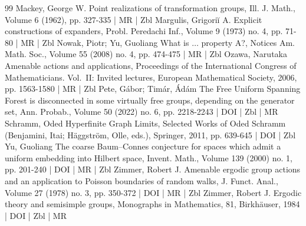 \documentclass[10pt]{amsart}
\theoremstyle{definition}\newtheorem{defi}[theo]{Definition}\newtheorem{rema}[theo]{Remark}\newtheorem{exam}[theo]{Example}\newtheorem{exem}[theo]{Example}\newtheorem{nota}[theo]{Notation}
\begin{document}
\begin{thebibliography}{99}
 Mackey, George W. Point realizations of transformation groups, Ill. J. Math., Volume 6 (1962), pp. 327-335 | MR | Zbl
 Margulis, Grigoriĭ A. Explicit constructions of expanders, Probl. Peredachi Inf., Volume 9 (1973) no. 4, pp. 71-80 | MR | Zbl
 Nowak, Piotr; Yu, Guoliang What is $\dots $ property A?, Notices Am. Math. Soc., Volume 55 (2008) no. 4, pp. 474-475 | MR | Zbl
 Ozawa, Narutaka Amenable actions and applications, Proceedings of the International Congress of Mathematicians. Vol. II: Invited lectures, European Mathematical Society, 2006, pp. 1563-1580 | MR | Zbl
 Pete, Gábor; Timár, Ádám The Free Uniform Spanning Forest is disconnected in some virtually free groups, depending on the generator set, Ann. Probab., Volume 50 (2022) no. 6, pp. 2218-2243 | DOI | Zbl | MR
 Schramm, Oded Hyperfinite Graph Limits, Selected Works of Oded Schramm (Benjamini, Itai; Häggström, Olle, eds.), Springer, 2011, pp. 639-645 | DOI | Zbl
 Yu, Guoliang The coarse Baum–Connes conjecture for spaces which admit a uniform embedding into Hilbert space, Invent. Math., Volume 139 (2000) no. 1, pp. 201-240 | DOI | MR | Zbl
 Zimmer, Robert J. Amenable ergodic group actions and an application to Poisson boundaries of random walks, J. Funct. Anal., Volume 27 (1978) no. 3, pp. 350-372 | DOI | MR | Zbl
 Zimmer, Robert J. Ergodic theory and semisimple groups, Monographs in Mathematics, 81, Birkhäuser, 1984 | DOI | Zbl | MR
\end{thebibliography}
\end{document}
